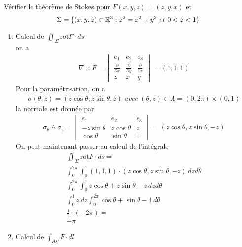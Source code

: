 \begin{myExample} Vérifier le théorème de Stokes pour $F(x,y,z)=(z,y,x)$ et
	\begin{eqnarray*}
		\Sigma=\{(x,y,z)\in\mathbb{R}^3:z^2=x^2+y^2\,\,et\,\,0<z<1\}
	\end{eqnarray*}
	\begin{enumerate}
		\item 
			Calcul de $\iint_\Sigma\mathrm{rot}F\cdot ds$
			\\
			on a
			\begin{eqnarray*}
				\nabla\times F = 
				\begin{vmatrix}
					e_1&e_2&e_3
					\\
					\frac{\partial}{\partial x}&\frac{\partial}{\partial y}&\frac{\partial}{\partial z}
					\\
					z&x&y
				\end{vmatrix}=
				(1,1,1)
			\end{eqnarray*}
			Pour la paramétrisation, on a
			\begin{eqnarray*}
				\sigma(\theta,z)=(z\cos\theta,z\sin\theta,z)\,\,
				avec
				\,\,
				(\theta,z)\in A=(0,2\pi)\times(0,1)
			\end{eqnarray*}
			la normale est donnée par
			\begin{eqnarray*}
				\sigma_\theta\wedge\sigma_z=
				\begin{vmatrix}
					e_1&e_2&e_3
					\\
					-z\sin\theta&z\cos\theta&z
					\\
					\cos\theta&\sin\theta&1
				\end{vmatrix}=
				(z\cos\theta,z\sin\theta,-z)
			\end{eqnarray*}
			On peut maintenant passer au calcul de l'intégrale
			\begin{eqnarray*}
				\iint_\Sigma\mathrm{rot}F\cdot ds=
				\\
				\int_{0}^{2\pi}\int_{0}^{1}(1,1,1)\cdot(z\cos\theta,z\sin\theta,-z)\,dzd\theta
				\\
				\int_{0}^{2\pi}\int_{0}^{1}z\cos\theta+z\sin\theta-z\,dzd\theta
				\\
				\int_{0}^{1}z\,dz\int_{0}^{2\pi}\cos\theta+\sin\theta-1\,d\theta
				\\
				\frac{1}{2}\cdot(-2\pi)=
				\\
				-\pi			
			\end{eqnarray*}
		\item
			Calcul de $\int_{\partial\Sigma}F\cdot dl$
			\\

\end{enumerate}
\end{myExample}
